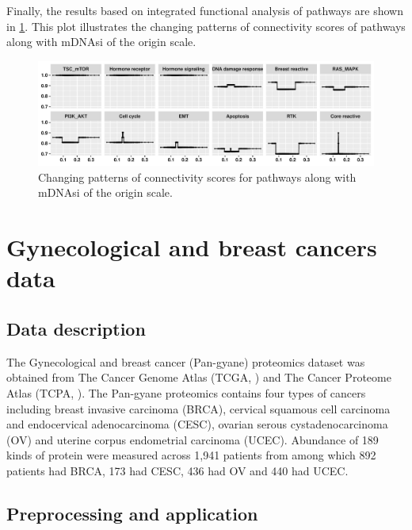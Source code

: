 \documentclass[
]{book}
\begin{document}
Finally, the results based on integrated functional analysis of pathways are shown in \ref{fig:mdnasipathway}. This plot illustrates the changing patterns of connectivity scores of pathways along with mDNAsi of the origin scale.

\begin{figure}

{\centering \includegraphics[width=0.9\linewidth]{images/mdna_cs_line} 

}

\caption{Changing patterns of connectivity scores for pathways along with mDNAsi of the origin scale.}\label{fig:mdnasipathway}
\end{figure}

\hypertarget{Gyne}{%
\chapter{Gynecological and breast cancers data}\label{Gyne}}

\hypertarget{Gynedata}{%
\section{Data description}\label{Gynedata}}

The Gynecological and breast cancer (Pan-gyane) proteomics dataset was obtained from The Cancer Genome Atlas (TCGA, \citet{weinstein2013cancer}) and The Cancer Proteome Atlas (TCPA, \citet{li2013tcpa}). The Pan-gyane proteomics contains four types of cancers including breast invasive carcinoma (BRCA), cervical squamous cell carcinoma and endocervical adenocarcinoma (CESC), ovarian serous cystadenocarcinoma (OV) and uterine corpus endometrial carcinoma (UCEC). Abundance of 189 kinds of protein were measured across 1,941 patients from \citet{weinstein2013cancer} among which 892 patients had BRCA, 173 had CESC, 436 had OV and 440 had UCEC.

\hypertarget{Gyneprocess}{%
\section{Preprocessing and application}\label{Gyneprocess}}
\end{document}
